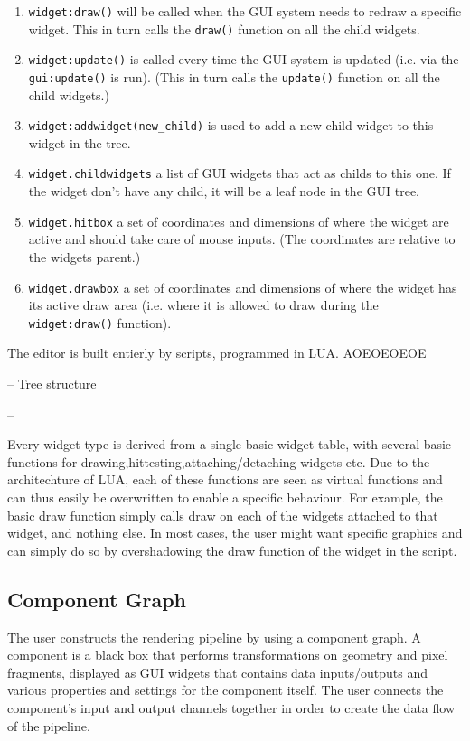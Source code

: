 \begin{enumerate}
  \item \texttt{widget:draw()} will be called when the GUI system needs to redraw a specific widget. This in turn calls the \texttt{draw()} function on all the child widgets.
  \item \texttt{widget:update()} is called every time the GUI system is updated (i.e. via the \texttt{gui:update()} is run). (This in turn calls the \texttt{update()} function on all the child widgets.)
  \item \texttt{widget:addwidget(new\_child)} is used to add a new child widget to this widget in the tree.
  \item \texttt{widget.childwidgets} a list of GUI widgets that act as childs to this one. If the widget don't have any child, it will be a leaf node in the GUI tree.
  \item \texttt{widget.hitbox} a set of coordinates and dimensions of where the widget are active and should take care of mouse inputs. (The coordinates are relative to the widgets parent.)
  \item \texttt{widget.drawbox} a set of coordinates and dimensions of where the widget has its active draw area (i.e. where it is allowed to draw during the \texttt{widget:draw()} function).
\end{enumerate}

The editor is built entierly by scripts, programmed in LUA. AOEOEOEOE

-- Tree structure


-- 

Every widget type is derived from a single basic widget table, with several basic functions for drawing,hittesting,attaching/detaching widgets etc. Due to the architechture of LUA, each of these functions are seen as virtual functions and can thus easily be overwritten to enable a specific behaviour. For example, the basic draw function simply calls draw on each of the widgets attached to that widget, and nothing else. In most cases, the user might want specific graphics and can simply do so by overshadowing the draw function of the widget in the script. 

\subsection{Component Graph}
The user constructs the rendering pipeline by using a component graph. A component is a black box that performs transformations on geometry and pixel fragments, displayed as GUI widgets that contains data inputs/outputs and various properties and settings for the component itself. The user connects the component’s input and output channels together in order to create the data flow of the pipeline. 

